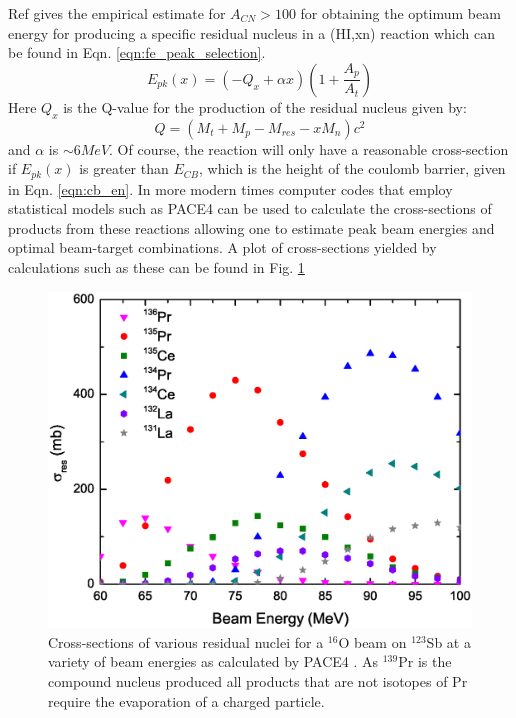 Ref \cite{nucSpecAndReacPartC} gives the empirical estimate for $A_{CN}>100$ for obtaining the optimum beam energy for producing a specific residual nucleus in a (HI,xn) reaction which can be found in Eqn. \ref{eqn:fe_peak_selection}.
\begin{equation}
\label{eqn:fe_peak_selection}
E_{pk}(x)=(-Q_{x} + \alpha{}x)(1+\frac{A_p}{A_t})
\end{equation}
Here $Q_x$ is the Q-value for the production of the residual nucleus given by:
\begin{equation}
\label{eqn:res_qvalue}
Q = (M_t+M_p-M_{res}-x M_n)c^2
\end{equation}
and $\alpha$ is $\sim6MeV$. Of course, the reaction will only have a reasonable cross-section if $E_{pk}(x)$ is greater than $E_{CB}$, which is the height of the coulomb barrier, given in Eqn. \ref{eqn:cb_en}. In more modern times computer codes that employ statistical models such as PACE4\cite{PACE4,PACE4_2} can be used to calculate the cross-sections of products from these reactions allowing one to estimate peak beam energies and optimal beam-target combinations. A plot of cross-sections yielded by calculations such as these can be found in Fig. \ref{fig:chp3-pace4-calc}

\begin{figure}[h!]
	\centerline{\includegraphics[width=\textwidth]{./img/c3/135Pr_calc_plot.eps}}
	\caption{Cross-sections of various residual nuclei for a $^{16}$O beam on $^{123}$Sb at a variety of beam energies as calculated by PACE4 \cite{PACE4}. As $^{139}$Pr is the compound nucleus produced all products that are not isotopes of Pr require the evaporation of a charged particle.}
	\label{fig:chp3-pace4-calc}
\end{figure}

